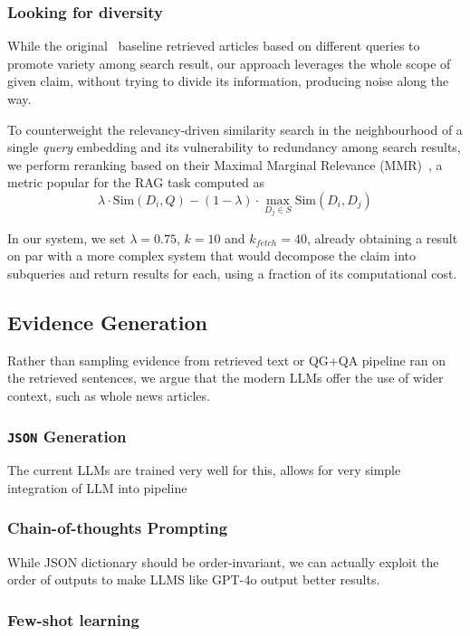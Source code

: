 \subsubsection{Looking for diversity}
While the original~\cite{averitec2024} baseline retrieved articles based on different queries to promote variety among search result, our approach leverages the whole scope of given claim, without trying to divide its information, producing noise along the way.

To counterweight the relevancy-driven similarity search in the neighbourhood of a single \textit{query} embedding and its vulnerability to redundancy among search results, we perform reranking based on their Maximal Marginal Relevance (MMR)~\cite{carbonell-mmr}, a metric popular for the RAG task computed as
$$\lambda \cdot \mathrm{Sim}(D_i, Q) - (1-\lambda) \cdot \max_{D_j \in S} \mathrm{Sim}(D_i, D_j)$$

In our system, we set $\lambda=0.75$, $k=10$ and $k_{fetch} = 40$, already obtaining a result on par with a more complex system that would decompose the claim into subqueries and return results for each, using a fraction of its computational cost.

\subsection{Evidence Generation}
Rather than sampling evidence from retrieved text or QG+QA pipeline ran on the retrieved sentences, we argue that the modern LLMs offer the use of wider context, such as whole news articles.

\subsubsection{\texttt{JSON} Generation}
The current LLMs are trained very well for this, allows for very simple integration of LLM into pipeline

\subsubsection{Chain-of-thoughts Prompting}
While JSON dictionary should be order-invariant, we can actually exploit the order of outputs to make LLMS like GPT-4o output better results.

\subsubsection{Few-shot learning}



